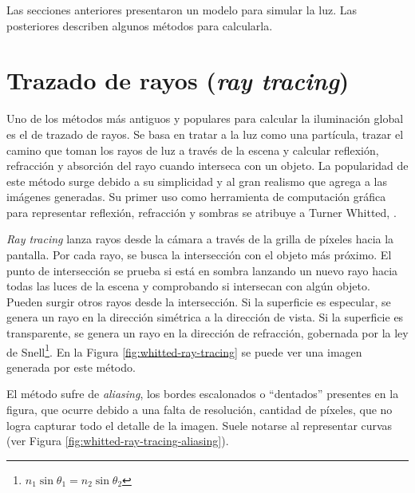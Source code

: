 Las secciones anteriores presentaron un modelo para simular la luz.
Las posteriores describen algunos métodos para calcularla.

\section{Trazado de rayos (\textit{ray tracing})}\label{sec:ray-tracing}

Uno de los métodos más antiguos y populares para calcular la iluminación global es el de trazado de rayos.
Se basa en tratar a la luz como una partícula, trazar el camino que toman los rayos de luz a través de la escena y calcular reflexión, refracción y absorción del rayo cuando interseca con un objeto.
La popularidad de este método surge debido a su simplicidad y al gran realismo que agrega a las imágenes generadas.
Su primer uso como herramienta de computación gráfica para representar reflexión, refracción y sombras se atribuye a Turner Whitted, \cite{whitted-1980}.

\textit{Ray tracing} lanza rayos desde la cámara a través de la grilla de píxeles hacia la pantalla.
Por cada rayo, se busca la intersección con el objeto más próximo.
El punto de intersección se prueba si está en sombra lanzando un nuevo rayo hacia todas las luces de la escena y comprobando si intersecan con algún objeto.
Pueden surgir otros rayos desde la intersección.
Si la superficie es especular, se genera un rayo en la dirección simétrica a la dirección de vista.
Si la superficie es transparente, se genera un rayo en la dirección de refracción, gobernada por la ley de Snell\footnote{$n_1 \sin{\theta_1} = n_2 \sin{\theta_2}$}.
En la Figura \ref{fig:whitted-ray-tracing} se puede ver una imagen generada por este método.

El método sufre de \textit{aliasing}, los bordes escalonados o ``dentados'' presentes en la figura, que ocurre debido a una falta de resolución, cantidad de píxeles, que no logra capturar todo el detalle de la imagen.
Suele notarse al representar curvas (ver Figura \ref{fig:whitted-ray-tracing-aliasing}).


